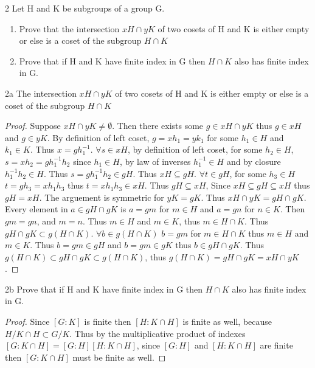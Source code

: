 \documentclass{article}
\begin{document}
\begin{PROB}{2}\label{Problem 2.}
    Let H and K be subgroups of a group G.
    
    \begin{enumerate}{}
        \item Prove that the intersection $xH \cap yK$ of two cosets of H and K is either empty or else is a coset of the subgroup $H \cap K$
        \item Prove that if H and K have finite index in G then $H \cap K$ also has finite index in G.
    \end{enumerate}
\end{PROB}
\begin{claim}{2a}
    The intersection $xH \cap yK$ of two cosets of H and K is either empty or else is a coset of the subgroup $H \cap K$
\end{claim}
\begin{proof}
    Suppose $xH \cap yK \neq \emptyset$. Then there exists some $g \in xH \cap yK$ thus $g \in xH$ and $g \in yK$. By definition of left coset, $g = xh_1 = yk_1$ for some $h_1 \in H$ and $k_1 \in K$. Thus $x = gh_1^{-1}$. $\forall s \in xH$, by definition of left coset, for some $h_2 \in H$, $s = xh_2 = gh_1^{-1}h_2$ since $h_1 \in H$, by law of inverses $h_1^{-1} \in H$ and by closure $h_1^{-1}h_2 \in H$. Thus $s = gh_1^{-1}h_2 \in gH$. Thus $xH \subseteq gH$. $\forall t \in gH$, for some $h_3 \in H$ $t = gh_3 = xh_1h_3$ thus $t = xh_1h_3 \in xH$. Thus $gH \subseteq xH$, Since $xH \subseteq gH \subseteq xH$ thus $gH = xH$. The arguement is symmetric for $yK = gK$. Thus $xH \cap yK = gH \cap gK$. Every element in $a \in gH \cap gK$ is $a = gm$ for $m \in H$ and $a = gn$ for $n \in K$. Then $gm = gn$, and $m = n$. Thus $m \in H$ and $m \in K$, thus $m \in H \cap K$. Thus $gH \cap gK \subset g(H \cap K)$. $\forall b \in g(H \cap K)$ $b = gm$ for $m \in H \cap K$ thus $m \in H$ and $m \in K$. Thus $b = gm \in gH$ and $b = gm \in gK$ thus $b \in gH \cap gK$. Thus $g(H \cap K) \subset gH \cap gK \subset g(H \cap K)$, thus $g(H \cap K) = gH \cap gK = xH \cap yK$.
\end{proof}

\begin{claim}{2b}
    Prove that if H and K have finite index in G then $H \cap K$ also has finite index in G.
\end{claim}
\begin{proof}
    Since $[G : K]$ is finite then $[H : K \cap H]$ is finite as well, because $H/K \cap H \subset G/K$. Thus by the multiplicative product of indexes $[G : K \cap H] = [G : H][H : K \cap H]$, since $[G : H]$ and $[H : K \cap H]$ are finite then $[G : K \cap H]$ must be finite as well.
\end{proof}
\end{document}
